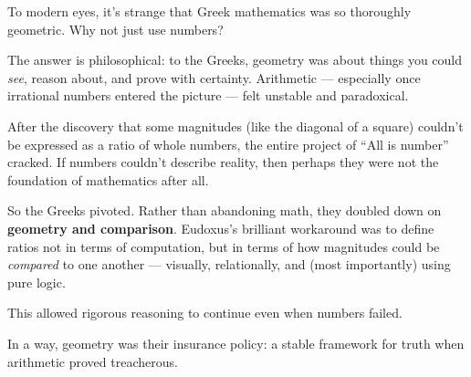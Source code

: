 \begin{tcolorbox}[title=Historical Sidebar: Why the Greeks Trusted Geometry, colback=gray!5, colframe=black, fonttitle=\bfseries]

    To modern eyes, it's strange that Greek mathematics was so thoroughly geometric. Why not just use numbers?

    \medskip
    
    The answer is philosophical: to the Greeks, geometry was about things you could \textit{see}, reason about, and prove with certainty. Arithmetic — especially once irrational numbers entered the picture — felt unstable and paradoxical.

    \medskip
    
    After the discovery that some magnitudes (like the diagonal of a square) couldn't be expressed as a ratio of whole numbers, the entire project of ``All is number'' cracked. If numbers couldn't describe reality, then perhaps they were not the foundation of mathematics after all.

    \medskip
    
    So the Greeks pivoted. Rather than abandoning math, they doubled down on \textbf{geometry and comparison}. Eudoxus’s brilliant workaround was to define ratios not in terms of computation, but in terms of how magnitudes could be \emph{compared} to one another — visually, relationally, and (most importantly) using pure logic.

    \medskip
    
    This allowed rigorous reasoning to continue even when numbers failed.

    \medskip
    
    In a way, geometry was their insurance policy: a stable framework for truth when arithmetic proved treacherous.
    
    \end{tcolorbox}
    